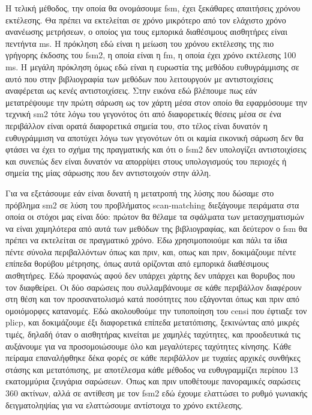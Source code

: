\documentclass[a4paper,10pt]{article}
\begin{document}
Η τελική μέθοδος, την οποία θα ονομάσουμε fsm, έχει ξεκάθαρες απαιτήσεις χρόνου
εκτέλεσης. Θα πρέπει να εκτελείται σε χρόνο μικρότερο από τον ελάχιστο χρόνο
ανανέωσης μετρήσεων, ο οποίος για τους εμπορικά διαθέσιμους αισθητήρες είναι
πεντήντα ms. Η πρόκληση εδώ είναι η μείωση του χρόνου εκτέλεσης της πιο
γρήγορης έκδοσης του fsm2, η οποία είναι η fm, η οποία έχει χρόνο εκτέλεσης 100
ms.  Η μεγάλη πρόκληση όμως εδώ είναι η ευρωστία της μεθόδου ευθυγράμμισης σε
αυτό που στην βιβλιογραφία των μεθόδων που λειτουργούν με αντιστοιχίσεις
αναφέρεται ως κενές αντιστοιχίσεις. Στην εικόνα εδώ βλέπουμε πως εάν
μετατρέψουμε την πρώτη σάρωση ως τον χάρτη μέσα στον οποίο θα εφαρμόσουμε την
τεχνική sm2 τότε λόγω του γεγονότος ότι από διαφορετικές θέσεις μέσα σε ένα
περιβάλλον είναι ορατά διαφορετικά σημεία του, στο τέλος είναι δυνατόν η
ευθυγράμμιση να αποτύχει λόγω των γεγονότων ότι οι καμία εικονική σάρωση δεν θα
φτάσει να έχει το σχήμα της πραγματικής και ότι ο fsm2 δεν υπολογίζει
αντιστοιχίσεις και συνεπώς δεν είναι δυνατόν να απορρίψει στους υπολογισμούς
του περιοχές ή σημεία της μίας σάρωσης που δεν αντιστοιχούν στην άλλη.

Για να εξετάσουμε εάν είναι δυνατή η μετατροπή της λύσης που δώσαμε στο
πρόβλημα sm2 σε λύση του προβλήματος scan-matching διεξάγουμε πειράματα στα
οποία οι στόχοι μας είναι δύο: πρώτον θα θέλαμε τα σφάλματα των μετασχηματισμών
να είναι χαμηλότερα από αυτά των μεθόδων της βιβλιογραφίας, και δεύτερον ο fsm
θα πρέπει να εκτελείται σε πραγματικό χρόνο. Εδω χρησιμοποιούμε και πάλι τα
ίδια πέντε σύνολα περιβαλλόντων όπως και πριν, και, οπως και πριν, δοκιμάζουμε
πέντε επίπεδα θορύβου μέτρησης, όπως αυτά ορίζονται από εμπορικά διαθέσιμους
αισθητήρες. Εδώ προφανώς αφού δεν υπάρχει χάρτης δεν υπάρχει και θορυβος που
τον διαφθείρει. Οι δύο σαρώσεις που συλλαμβάνουμε σε κάθε περιβάλλον διαφέρουν
στη θέση και τον προσανατολισμό κατά ποσότητες που εξάγονται όπως και πριν από
ομοιόμορφες κατανομές. Εδώ ακολουθούμε την τυποποίηση του censi που έφτιαξε τον
plicp, και δοκιμάζουμε έξι διαφορετικά επίπεδα μετατόπισης, ξεκινώντας από
μικρές τιμές, δηλαδή όταν ο αισθητήρας κινείται με χαμηλές ταχύτητες, και
προοδευτικά τις αυξάνουμε για να προσομοιώσουμε όλο και μεγαλύτερες ταχύτητες
κίνησης. Κάθε πείραμα επαναλήφθηκε δέκα φορές σε κάθε περιβάλλον με τυχαίες
αρχικές συνθήκες στάσης και μετατόπισης, με αποτέλεσμα κάθε μέθοδος να
ευθυγραμμίζει περίπου 13 εκατομμύρια ζευγάρια σαρώσεων. Όπως και πριν υποθέτουμε
πανοραμικές σαρώσεις 360 ακτίνων, αλλά σε αντίθεση με τον fsm2 εδώ έχουμε
ελαττώσει το ρυθμό γωνιακής δειγματοληψίας για να ελαττώσουμε αντίστοιχα το
χρόνο εκτέλεσης.
\end{document}
